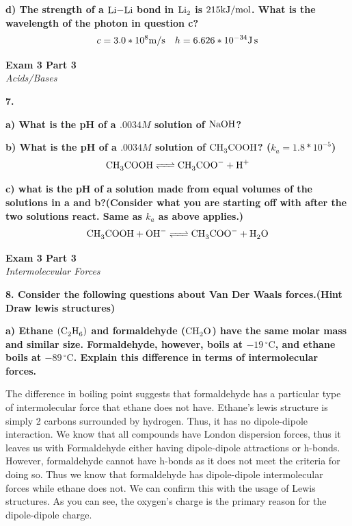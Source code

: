 \documentclass{article}
\begin{document}
    \textbf{d) The strength of a $\ce{Li-Li}$ bond in $\ce{Li2}$ is $215 \si[per-mode=symbol]{\kilo\joule\per\mole}$. What is the wavelength of the photon in question c?}
    $$ c = 3.0 * 10^{8} \si[per-mode=symbol]{\meter\per\second} \quad h = 6.626 * 10^{-34} \si{\joule\second}$$

    \pagebreak

    \begin{center}
        \textbf{Exam 3 Part 3}\\
        \textit{Acids/Bases}
    \end{center}
    \textbf{7.}

    \textbf{a) What is the pH of a $.0034 M$ solution of         $\ce{NaOH}$?}

    \textbf{b) What is the pH of a $.0034 M$ solution of         $\ce{CH3COOH}$? ($k_{a} = 1.8 * 10^{-5}$)}
    $$\ce{CH3COOH <=> CH3COO- + H+}$$

    \textbf{c) what is the pH of a solution made from equal volumes of the solutions in a and b?(Consider what you are starting off with after the two solutions react. Same as $k_{a}$ as above applies.)}
    $$\ce{CH3COOH + OH- <=> CH3COO- + H2O}$$

    \pagebreak

    \begin{center}
        \textbf{Exam 3 Part 3}\\
        \textit{Intermolecvular Forces}
    \end{center}
    \textbf{8. Consider the following questions about Van Der Waals forces.(Hint Draw lewis structures)}

    \textbf{a) Ethane $(\ce{C2H6})$ and formaldehyde ($\ce{CH2O}$) have the same molar mass and similar size. Formaldehyde, however, boils at $-19\,^{\circ}\mathrm{C}$, and ethane boils at $-89\,^{\circ}\mathrm{C}$. Explain this difference in terms of intermolecular forces.}

    The difference in boiling point suggests that formaldehyde has a particular type of intermolecular force that ethane does not have. Ethane's lewis structure is simply 2 carbons surrounded by hydrogen. Thus, it has no dipole-dipole interaction. We know that all compounds have London dispersion forces, thus it leaves us with Formaldehyde either having dipole-dipole attractions or h-bonds. However, formaldehyde cannot have h-bonds as it does not meet the criteria for doing so. Thus we know that formaldehyde has dipole-dipole intermolecular forces while ethane does not.  We can confirm this with the usage of Lewis structures. As you can see, the oxygen's charge is the primary reason for the dipole-dipole charge.
\end{document}
